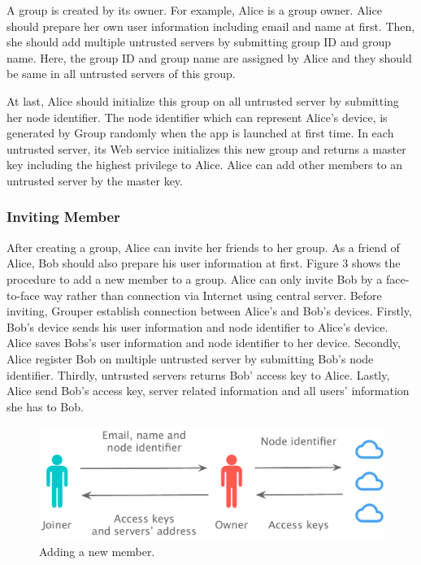 \documentclass[twocolumn,10pt]{article}
\begin{document}
A group is created by its owner. For example, Alice is a group owner. Alice should prepare her own user information including email and name at first. Then, she should add multiple untrusted servers by submitting group ID and group name. Here, the group ID and group name are assigned by Alice and they should be same in all untrusted servers of this group. 

At last, Alice should initialize this group on all untrusted server by submitting her node identifier. The node identifier which can represent Alice's device, is generated by Group randomly when the app is launched at first time.  In each untrusted server, its Web service initializes this new group and returns a master key including the highest privilege to Alice. Alice can add other members to an untrusted server by the master key.

\subsubsection{Inviting Member}

After creating a group, Alice can invite her friends to her group. As a friend of Alice, Bob should also prepare his user information at first. Figure 3 shows the procedure to add a new member to a group. Alice can only invite Bob by a face-to-face way rather than connection via Internet using central server. Before inviting, Grouper establish connection between Alice's and Bob's devices. Firstly, Bob's device sends his user information and node identifier to Alice's device. Alice saves Bobs's user information and node identifier to her device. Secondly, Alice register Bob on multiple untrusted server by submitting Bob's node identifier. Thirdly, untrusted servers returns Bob' access key to Alice. Lastly, Alice send Bob's access key, server related information and all users' information she has to Bob.

\begin{figure}[t]
	\centering
	\includegraphics[scale=0.38]{add_member}
	\caption{Adding a new member.}
\end{figure}
\end{document}
